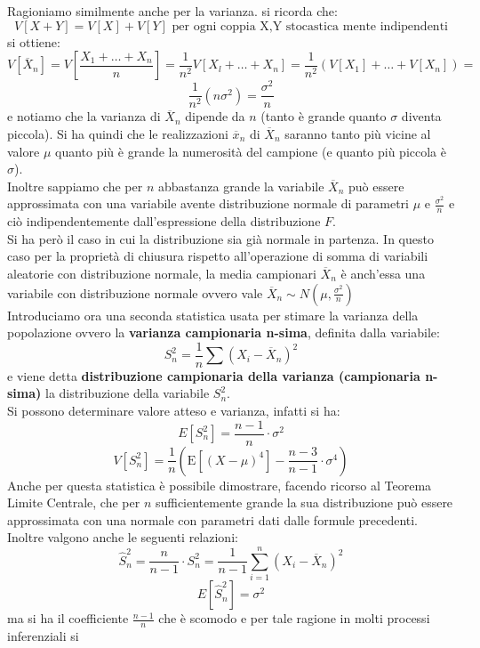 \documentclass[a4paper,12pt, oneside]{book}
\begin{document}
\newpage
Ragioniamo similmente anche per la varianza. si ricorda che:
\[V[X+Y]=V[X]+V[Y]\mbox{ per ogni coppia X,Y stocastica mente indipendenti}\]
si ottiene:
\[V\left[\overline{X}_{n}\right]=V\left[\frac{X_{1}+\ldots+X_{n}}{n}\right]=\frac{1}{n^{2}}V\left[X_{l}+\ldots+X_{n}\right]=\frac{1}{n^{2}}\left(V\left[X_{1}\right]+\ldots+V\left[X_{n}\right]\right)=\] \[ \frac{1}{n^{2}}\left(n \sigma^{2}\right)=\frac{\sigma^{2}}{n}\]
e notiamo che la varianza di $\overline{X}_n$ dipende da $n$ (tanto è grande quanto $\sigma$ diventa piccola). Si ha quindi che le realizzazioni $\overline{x}_n$ di $\overline{X}_n$ saranno tanto più vicine al valore
$\mu$ quanto più è grande la numerosità del campione (e quanto più piccola è $\sigma$).\\
Inoltre sappiamo che per $n$ abbastanza grande la variabile $\overline{X}_n$ può essere approssimata con una variabile avente distribuzione normale di parametri $\mu \mbox{ e } \frac{\sigma^2}{n}$ e ciò indipendentemente dall’espressione della distribuzione $F$.\\
Si ha però il caso in cui la distribuzione sia già normale in partenza. In questo caso per la proprietà di chiusura rispetto all’operazione di somma di variabili
aleatorie con distribuzione normale, la media campionari $\overline{X}_n$ è anch'essa una variabile con distribuzione normale ovvero vale $\overline{X}_n\sim N(\mu, \frac{\sigma^2}{n})$\\
Introduciamo ora una seconda statistica usata per stimare la varianza della popolazione ovvero la \textbf{varianza campionaria n-sima}, definita dalla variabile:
\[S_n^2=\frac{1}{n}\sum(X_i-\overline{X}_n)^2\]
e viene detta \textbf{distribuzione campionaria della varianza (campionaria n-sima)} la distribuzione della variabile $S_n^2$. \\
Si possono determinare valore atteso e varianza, infatti si ha:
\[E\left[S_{n}^{2}\right]=\frac{n-1}{n} \cdot \sigma^{2}\]
\[V\left[S_{n}^{2}\right]=\frac{1}{n}\left(\mathrm{E}\left[(X-\mu)^{4}\right]-\frac{n-3}{n-1} \cdot \sigma^{4}\right)\]
Anche per questa statistica è possibile dimostrare, facendo ricorso al Teorema Limite
Centrale, che per $n$ sufficientemente grande la sua distribuzione può essere
approssimata con una normale con parametri dati dalle formule precedenti.\\
Inoltre valgono anche le seguenti relazioni:
\[\hat{S}_{n}^{2}=\frac{n}{n-1} \cdot S_{n}^{2}=\frac{1}{n-1} \sum_{i=1}^{n}\left(X_{i}-\overline{X}_{n}\right)^{2}\]
\[E[\hat{S}_n^2]=\sigma^2\]
ma si ha il coefficiente $\frac{n-1}{n}$ che è scomodo e per tale ragione in molti processi inferenziali si
\end{document}
